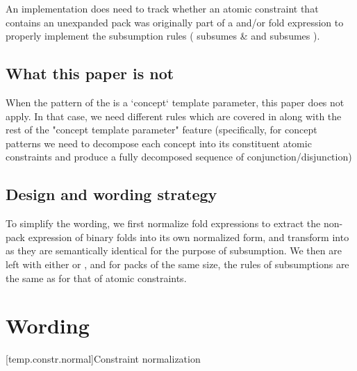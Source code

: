 \documentclass{wg21}
\begin{document}
An implementation does need to track whether an atomic constraint that contains an unexpanded pack was originally part of a and/or fold expression to properly
implement the subsumption rules (\tcode{\&\&} subsumes \tcode{||} \& \tcode{\&\&} and \tcode{||} subsumes \tcode{||}).


\subsection{What this paper is not}

When the pattern of the  is a `concept` template parameter, this paper does not apply. In that case, we need different rules which are covered in  along with the rest of the "concept template parameter" feature (specifically, for concept patterns we need to decompose each concept into its constituent atomic constraints and produce a fully decomposed sequence of conjunction/disjunction)


\subsection{Design and wording strategy}

To simplify the wording, we first normalize fold expressions to extract the non-pack expression of binary folds into its own normalized form,
and transform  into  as they are semantically identical for the purpose of subsumption.
We then are left with either  or , and for packs of the same size, the rules of subsumptions are the same as for that of atomic constraints.

\section{Wording}

[temp.constr.normal]{Constraint normalization}
%
\end{document}
